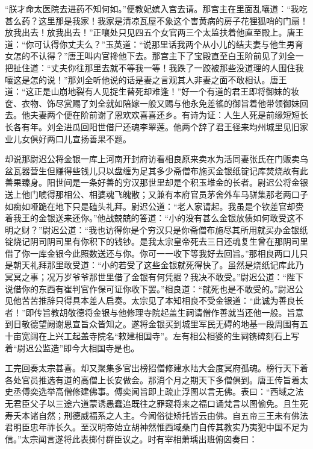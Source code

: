 \documentclass[12pt,UTF8]{ctexbook}
\begin{document}
{“朕才命太医院去进药不知何如。”便教妃嫔入宫去请。那宫主在里面乱嚷道：“我吃甚么药？这里那是我家！我家是清凉瓦屋不象这个害黄病的房子花狸狐哨的门扇！放我出去！放我出去！”正嚷处只见四五个女官两三个太监扶着他直至殿上。唐王道：“你可认得你丈夫么？”玉英道：“说那里话我两个从小儿的结夫妻与他生男育女怎的不认得？”唐王叫内官搀他下去。那宫主下了宝殿直至白玉阶前见了刘全一把扯住道：“丈夫你往那里去就不等我一等！我跌了一跤被那些没道理的人围住我嚷这是怎的说！”那刘全听他说的话是妻之言观其人非妻之面不敢相认。唐王道：“这正是山崩地裂有人见捉生替死却难逢！”好一个有道的君王即将御妹的妆奁、衣物、饰尽赏赐了刘全就如陪嫁一般又赐与他永免差徭的御旨着他带领御妹回去。他夫妻两个便在阶前谢了恩欢欢喜喜还乡。有诗为证：人生人死是前缘短短长长各有年。刘全进瓜回阳世借尸还魂李翠莲。他两个辞了君王径来均州城里见旧家业儿女俱好两口儿宣扬善果不题。

却说那尉迟公将金银一库上河南开封府访看相良原来卖水为活同妻张氏在门贩卖乌盆瓦器营生但赚得些钱儿只以盘缠为足其多少斋僧布施买金银纸锭记库焚烧故有此善果臻身。阳世间是一条好善的穷汉那世里却是个积玉堆金的长者。尉迟公将金银送上他门唬得那相公、相婆魂飞魄散；又兼有本府官员茅舍外车马骈集那老两口子如痴如哑跪在地下只是磕头礼拜。尉迟公道：“老人家请起。我虽是个钦差官却赍着我王的金银送来还你。”他战兢兢的答道：“小的没有甚么金银放债如何敢受这不明之财？”尉迟公道：“我也访得你是个穷汉只是你斋僧布施尽其所用就买办金银纸锭烧记阴司阴司里有你积下的钱钞。是我太宗皇帝死去三日还魂复生曾在那阴司里借了你一库金银今此照数送还与你。你可一一收下等我好去回旨。”那相良两口儿只是朝天礼拜那里敢受道：“小的若受了这些金银就死得快了。虽然是烧纸记库此乃冥冥之事；况万岁爷爷那世里借了金银有何凭据？我决不敢受。”尉迟公道：“陛下说借你的东西有崔判官作保可证你收下罢。”相良道：“就死也是不敢受的。”尉迟公见他苦苦推辞只得具本差人启奏。太宗见了本知相良不受金银道：“此诚为善良长者！”即传旨教胡敬德将金银与他修理寺院起盖生祠请僧作善就当还他一般。旨意到日敬德望阙谢恩宣旨众皆知之。遂将金银买到城里军民无碍的地基一段周围有五十亩宽阔在上兴工起盖寺院名“敕建相国寺”。左有相公相婆的生祠镌碑刻石上写着“尉迟公监造”即今大相国寺是也。

工完回奏太宗甚喜。却又聚集多官出榜招僧修建水陆大会度冥府孤魂。榜行天下着各处官员推选有道的高僧上长安做会。那消个月之期天下多僧俱到。唐王传旨着太史丞傅奕选举高僧修建佛事。傅奕闻旨即上疏止浮图以言无佛。表曰：“西域之法无君臣父子以三途六道蒙诱愚蠢追既往之罪窥将来之福口诵梵言以图偷免。且生死寿夭本诸自然；刑德威福系之人主。今闻俗徒矫托皆云由佛。自五帝三王未有佛法君明臣忠年祚长久。至汉明帝始立胡神然惟西域桑门自传其教实乃夷犯中国不足为信。”太宗闻言遂将此表掷付群臣议之。时有宰相萧瑀出班俯囟奏曰：

}
\end{document}
